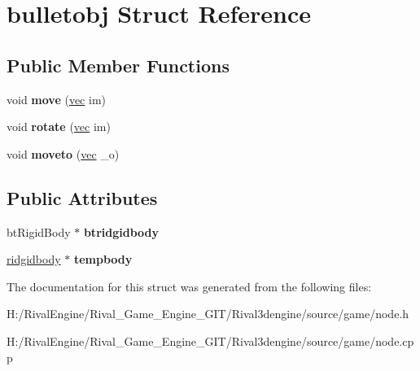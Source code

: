 \hypertarget{structbulletobj}{}\section{bulletobj Struct Reference}
\label{structbulletobj}
\subsection*{Public Member Functions}
\begin{DoxyCompactItemize}
\item 
\mbox{\label{structbulletobj_a3e1d541bff689c0390f9148378095136}} 
void {\bfseries move} (\hyperlink{structvec}{vec} im)
\item 
\mbox{\label{structbulletobj_aa5ee748fb56578ba86fcf5a6fae6e66c}} 
void {\bfseries rotate} (\hyperlink{structvec}{vec} im)
\item 
\mbox{\label{structbulletobj_aba11c4ec444f432b44f382702217e6c2}} 
void {\bfseries moveto} (\hyperlink{structvec}{vec} \+\_\+o)
\end{DoxyCompactItemize}
\subsection*{Public Attributes}
\begin{DoxyCompactItemize}
\item 
\mbox{\label{structbulletobj_a795fb9d432053b7f1b7cf017e7927d15}} 
bt\+Rigid\+Body $\ast$ {\bfseries btridgidbody}
\item 
\mbox{\label{structbulletobj_a2dd64787478fce063a47edc8cb8ff05e}} 
\hyperlink{structridgidbody}{ridgidbody} $\ast$ {\bfseries tempbody}
\end{DoxyCompactItemize}


The documentation for this struct was generated from the following files\+:\begin{DoxyCompactItemize}
\item 
H\+:/\+Rival\+Engine/\+Rival\+\_\+\+Game\+\_\+\+Engine\+\_\+\+G\+I\+T/\+Rival3dengine/source/game/node.\+h\item 
H\+:/\+Rival\+Engine/\+Rival\+\_\+\+Game\+\_\+\+Engine\+\_\+\+G\+I\+T/\+Rival3dengine/source/game/node.\+cpp\end{DoxyCompactItemize}
